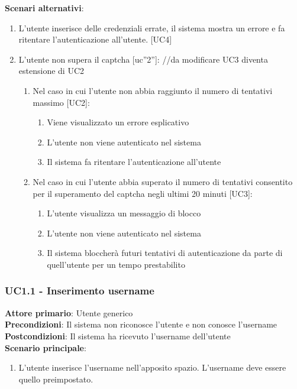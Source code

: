 \textbf{Scenari alternativi}:
\begin{enumerate}
    \item L'utente inserisce delle credenziali errate, il sistema mostra un errore e fa ritentare l'autenticazione all'utente. [UC4]
    \item L'utente non supera il captcha [uc”2”]: //da modificare UC3 diventa estensione di UC2
    \begin{enumerate}
	\item Nel caso in cui l'utente non abbia raggiunto il numero di tentativi massimo [UC2]:
	\begin{enumerate}
	    \item Viene visualizzato un errore esplicativo
	    \item L'utente non viene autenticato nel sistema
	    \item Il sistema fa ritentare l'autenticazione all'utente 
        \end{enumerate}
	\item Nel caso in cui l'utente abbia superato il numero di tentativi consentito per il superamento del captcha negli ultimi 20 minuti [UC3]:
	\begin{enumerate}
	    \item L'utente visualizza un messaggio di blocco
	    \item L'utente non viene autenticato nel sistema
	    \item Il sistema bloccherà futuri tentativi di autenticazione da parte di quell'utente per un tempo prestabilito
        \end{enumerate}
    \end{enumerate}
\end{enumerate}

\subsubsection{UC1.1 - Inserimento username}
\textbf{Attore primario}: Utente generico\\
\textbf{Precondizioni}: Il sistema non riconosce l'utente e non conosce l'username\\
\textbf{Postcondizioni}: Il sistema ha ricevuto l'username dell'utente\\
\textbf{Scenario principale}:
\begin{enumerate}
   \item L'utente inserisce l'username nell'apposito spazio. L'username deve essere quello preimpostato.
\end{enumerate}

